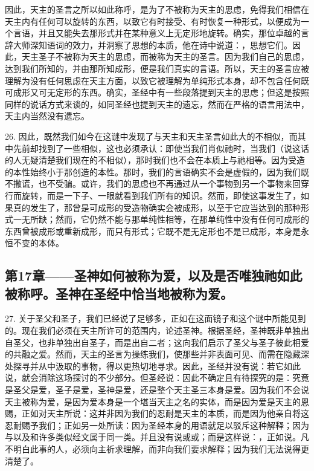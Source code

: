 因此，天主的圣言之所以如此称呼，是为了不被称为天主的思虑，免得我们相信在天主内有任何可以旋转的东西，以致它有时接受、有时恢复一种形式，以便成为一个言语，并且又能失去那形式并在某种意义上无定形地旋转。确实，那位卓越的言辞大师深知语词的效力，并洞察了思想的本质，他在诗中说道：，思想它们。因此，天主圣子不被称为天主的思虑，而被称为天主的圣言。因为我们自己的思虑，达到我们所知的，并由那所知成形，便是我们真实的言语。所以，天主的圣言应被理解为没有任何思虑在天主方面，以致它被理解为单纯形式本身，却不包含任何既可成形又可无定形的东西。确实，圣经中有一些段落提到天主的思虑；但这是按照同样的说话方式来谈的，如同圣经也提到天主的遗忘，然而在严格的语言用法中，天主内当然没有遗忘。\par

26. 因此，既然我们如今在这谜中发现了与天主和天主圣言如此大的不相似，而其中先前却找到了一些相似，这也必须承认：即使当我们肖似祂时，当我们（说这话的人无疑清楚我们现在的不相似），那时我们也不会在本质上与祂相等。因为受造的本性始终小于那创造的本性。那时，我们的言语确实不会是虚假的，因为我们既不撒谎，也不受骗。或许，我们的思虑也不再通过从一个事物到另一个事物来回穿行而旋转，而是一下子、一眼就看到我们所有的知识。然而，即使这事发生了，如果真的发生了，那曾是可成形的受造物确实会被成形，以至于它应当达到的那种形式一无所缺；然而，它仍然不能与那单纯性相等，在那单纯性中没有任何可成形的东西曾被成形或重新成形，而只有形式；它既不是无定形也不是已成形，本身是永恒不变的本体。\par


\subsection{第17章——圣神如何被称为爱，以及是否唯独祂如此被称呼。圣神在圣经中恰当地被称为爱。}

27. 关于圣父和圣子，我们已经说了足够多，正如在这面镜子和这个谜中所能见到的。现在我们必须在天主所许可的范围内，论述圣神。根据圣经，圣神既非单独出自圣父，也非单独出自圣子，而是出自二者；这向我们启示了圣父与圣子彼此相爱的共融之爱。然而，天主的圣言为操练我们，使那些并非表面可见、而需在隐藏深处探寻并从中汲取的事物，得以更热切地寻求。因此，圣经并没有说：若它如此说，就会消除这场探讨的不少部分。但圣经说：因此不确定且有待探究的是：究竟是圣父是爱，圣子是爱，圣神是爱，还是整个天主圣三本身是爱。因为我们不会说天主被称为爱，是因为爱本身是一个堪当天主之名的实体，而是因为爱是天主的恩赐，正如对天主所说：这并非因为我们的忍耐是天主的本质，而是因为他亲自将这忍耐赐予我们；正如另一处所读：因为圣经本身的用语就足以驳斥这种解释；因为与以及和许多类似经文属于同一类。并且没有说或或；而是这样说：，正如说。凡不明白此事的人，必须向主祈求理解，而非向我们要求解释；因为我们无法说得更清楚了。\par

